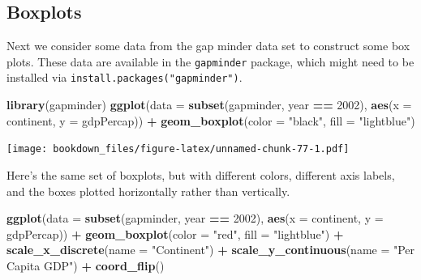 \documentclass[]{krantz}
\makeatletter
\newenvironment{Shaded}{\begin{snugshade}}{\end{snugshade}}
\newcommand{\KeywordTok}[1]{\textcolor[rgb]{0.27,0.27,0.27}{\textbf{#1}}}
\newcommand{\DataTypeTok}[1]{\textcolor[rgb]{0.27,0.27,0.27}{#1}}
\newcommand{\DecValTok}[1]{\textcolor[rgb]{0.06,0.06,0.06}{#1}}
\newcommand{\StringTok}[1]{\textcolor[rgb]{0.5,0.5,0.5}{#1}}
\newcommand{\OperatorTok}[1]{\textcolor[rgb]{0.43,0.43,0.43}{\textbf{#1}}}
\newcommand{\NormalTok}[1]{#1}
\newenvironment{kframe}{%
\medskip{}
\setlength{\fboxsep}{.8em}
 \def\at@end@of@kframe{}%
 \ifinner\ifhmode%
  \def\at@end@of@kframe{\end{minipage}}%
  \begin{minipage}{\columnwidth}%
 \fi\fi%
 \def\FrameCommand##1{\hskip\@totalleftmargin \hskip-\fboxsep
 \colorbox{shadecolor}{##1}\hskip-\fboxsep
     \hskip-\linewidth \hskip-\@totalleftmargin \hskip\columnwidth}%
 \MakeFramed {\advance\hsize-\width
   \@totalleftmargin\z@ \linewidth\hsize
   \@setminipage}}%
 {\par\unskip\endMakeFramed%
 \at@end@of@kframe}
\renewenvironment{Shaded}{\begin{kframe}}{\end{kframe}}
\makeatother
\begin{document}
\subsection{Boxplots}\label{boxplots}

Next we consider some data from the gap minder data set to construct
some box plots. These data are available in the \texttt{gapminder}
package, which might need to be installed via
\texttt{install.packages("gapminder")}.

\begin{Shaded}
\begin{Highlighting}[]
\KeywordTok{library}\NormalTok{(gapminder)}
\KeywordTok{ggplot}\NormalTok{(}\DataTypeTok{data =} \KeywordTok{subset}\NormalTok{(gapminder,  year }\OperatorTok{==}\StringTok{ }\DecValTok{2002}\NormalTok{), }
       \KeywordTok{aes}\NormalTok{(}\DataTypeTok{x =}\NormalTok{ continent, }\DataTypeTok{y =}\NormalTok{ gdpPercap)) }\OperatorTok{+}\StringTok{ }
\StringTok{    }\KeywordTok{geom_boxplot}\NormalTok{(}\DataTypeTok{color =} \StringTok{"black"}\NormalTok{, }\DataTypeTok{fill =} \StringTok{"lightblue"}\NormalTok{)}
\end{Highlighting}
\end{Shaded}

\texttt{[image: bookdown\_files/figure-latex/unnamed-chunk-77-1.pdf]}

Here's the same set of boxplots, but with different colors, different
axis labels, and the boxes plotted horizontally rather than vertically.

\begin{Shaded}
\begin{Highlighting}[]
\KeywordTok{ggplot}\NormalTok{(}\DataTypeTok{data =} \KeywordTok{subset}\NormalTok{(gapminder,  year }\OperatorTok{==}\StringTok{ }\DecValTok{2002}\NormalTok{), }
       \KeywordTok{aes}\NormalTok{(}\DataTypeTok{x =}\NormalTok{ continent, }\DataTypeTok{y =}\NormalTok{ gdpPercap)) }\OperatorTok{+}\StringTok{ }
\StringTok{    }\KeywordTok{geom_boxplot}\NormalTok{(}\DataTypeTok{color =} \StringTok{"red"}\NormalTok{, }\DataTypeTok{fill =} \StringTok{"lightblue"}\NormalTok{) }\OperatorTok{+}\StringTok{ }
\StringTok{    }\KeywordTok{scale_x_discrete}\NormalTok{(}\DataTypeTok{name =} \StringTok{"Continent"}\NormalTok{) }\OperatorTok{+}\StringTok{ }
\StringTok{    }\KeywordTok{scale_y_continuous}\NormalTok{(}\DataTypeTok{name =} \StringTok{"Per Capita GDP"}\NormalTok{) }\OperatorTok{+}\StringTok{ }\KeywordTok{coord_flip}\NormalTok{()}
\end{Highlighting}
\end{Shaded}
\end{document}
